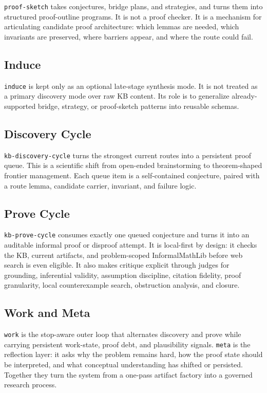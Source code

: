 \documentclass[11pt]{article}
\begin{document}
\texttt{proof-sketch} takes conjectures, bridge plans, and strategies, and turns them into structured proof-outline programs. It is not a proof checker. It is a mechanism for articulating candidate proof architecture: which lemmas are needed, which invariants are preserved, where barriers appear, and where the route could fail.

\subsection{Induce}

\texttt{induce} is kept only as an optional late-stage synthesis mode. It is not treated as a primary discovery mode over raw KB content. Its role is to generalize already-supported bridge, strategy, or proof-sketch patterns into reusable schemas.

\subsection{Discovery Cycle}

\texttt{kb-discovery-cycle} turns the strongest current routes into a persistent proof queue. This is a scientific shift from open-ended brainstorming to theorem-shaped frontier management. Each queue item is a self-contained conjecture, paired with a route lemma, candidate carrier, invariant, and failure logic.

\subsection{Prove Cycle}

\texttt{kb-prove-cycle} consumes exactly one queued conjecture and turns it into an auditable informal proof or disproof attempt. It is local-first by design: it checks the KB, current artifacts, and problem-scoped InformalMathLib before web search is even eligible. It also makes critique explicit through judges for grounding, inferential validity, assumption discipline, citation fidelity, proof granularity, local counterexample search, obstruction analysis, and closure.

\subsection{Work and Meta}

\texttt{work} is the stop-aware outer loop that alternates discovery and prove while carrying persistent work-state, proof debt, and plausibility signals. \texttt{meta} is the reflection layer: it asks why the problem remains hard, how the proof state should be interpreted, and what conceptual understanding has shifted or persisted. Together they turn the system from a one-pass artifact factory into a governed research process.
\end{document}
